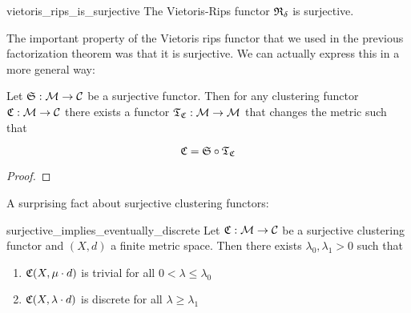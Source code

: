 \begin{myremark}{}{vietoris_rips_is_surjective}
    The Vietoris-Rips functor $\mathfrak{R}_\delta$ is surjective.
\end{myremark}

The important property of the Vietoris rips functor that we used in the previous factorization theorem was that it is surjective. We can actually express this in a more general way:

\begin{proposition}{}{}
    Let $\mathfrak{S}: \mathcal{M} \to \mathcal{C}$ be a surjective functor. Then for any clustering functor $\mathfrak{C}: \mathcal{M} \to \mathcal{C}$ there exists a functor $\mathfrak{T}_{\mathfrak{C}}: \mathcal{M} \to \mathcal{M}$ that changes the metric such that

    \begin{equation*}
        \mathfrak{C} = \mathfrak{S} \circ \mathfrak{T}_{\mathfrak{C}}
    \end{equation*}

    \newresult {}
\end{proposition}

\begin{proof}
    \newresult[]
\end{proof}

A surprising fact about surjective clustering functors:

\begin{lemma}{}{surjective_implies_eventually_discrete}
    Let $\mathfrak{C}: \mathcal{M} \to \mathcal{C}$ be a surjective clustering functor and $(X,d)$ a finite metric space. Then there exists $\lambda_0,\lambda_1 > 0$ such that
    \begin{enumerate}
        \item $\mathfrak{C}(X,\mu \cdot d)$ is trivial for all $0 < \lambda \le \lambda_0$
        \item $\mathfrak{C}(X,\lambda \cdot d)$ is discrete for all $\lambda \ge \lambda_1$
    \end{enumerate}

    \newresult
\end{lemma}

